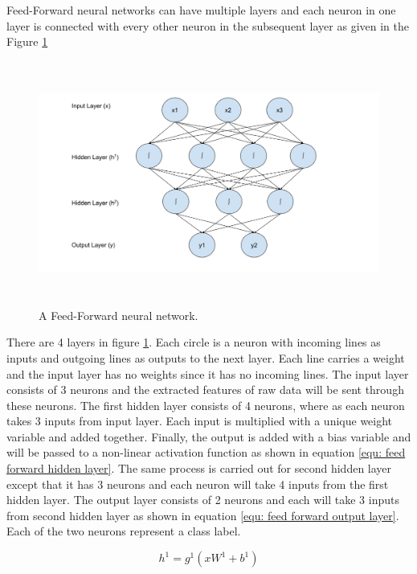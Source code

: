\documentclass[a4paper, 11pt]{article}
\begin{document}
Feed-Forward neural networks \cite{Svozil1997} can have multiple layers and each neuron in one layer is connected with every other neuron in the subsequent layer as given in the Figure \ref{fig:Feed forward neural network}

\begin{figure}[htpb]
    \centering
    \includegraphics[width=\textwidth,height=8cm,keepaspectratio=true]
    {feed-forward-neural-network.png}
    \caption{
        A Feed-Forward neural network.
    }
    \label{fig:Feed forward neural network}
\end{figure}

There are 4 layers in figure \ref{fig:Feed forward neural network}. Each circle is a neuron with incoming lines as inputs and outgoing lines as outputs to the next layer. Each line carries a weight and the input layer has no weights since it has no incoming lines. The input layer consists of 3 neurons and the extracted features of raw data will be sent through these neurons. The first hidden layer consists of 4 neurons, where as each neuron takes 3 inputs from input layer. Each input is multiplied with a unique weight variable and added together.  Finally, the output is added with a bias variable and will be passed to a non-linear activation function as shown in equation \ref{equ: feed forward hidden layer}. The same process is carried out for second hidden layer except that it has 3 neurons and each neuron will take 4 inputs from the first hidden layer. The output layer consists of 2 neurons and each will take 3 inputs from second hidden layer as shown in equation \ref{equ: feed forward output layer}. Each of the two neurons represent a class label.

\begin{equation} \label{equ: feed forward hidden layer}
h^1 = g^1(xW^1 + b^1)
\end{equation}
\end{document}
